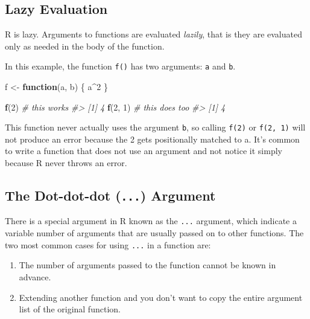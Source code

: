 \documentclass[]{book}
\newenvironment{Shaded}{\begin{snugshade}}{\end{snugshade}}
\newcommand{\KeywordTok}[1]{\textcolor[rgb]{0.13,0.29,0.53}{\textbf{#1}}}
\newcommand{\DecValTok}[1]{\textcolor[rgb]{0.00,0.00,0.81}{#1}}
\newcommand{\StringTok}[1]{\textcolor[rgb]{0.31,0.60,0.02}{#1}}
\newcommand{\CommentTok}[1]{\textcolor[rgb]{0.56,0.35,0.01}{\textit{#1}}}
\newcommand{\ControlFlowTok}[1]{\textcolor[rgb]{0.13,0.29,0.53}{\textbf{#1}}}
\newcommand{\OperatorTok}[1]{\textcolor[rgb]{0.81,0.36,0.00}{\textbf{#1}}}
\newcommand{\NormalTok}[1]{#1}
\providecommand{\tightlist}{%
  \setlength{\itemsep}{0pt}\setlength{\parskip}{0pt}}
\begin{document}
\subsection{Lazy Evaluation}\label{lazy-evaluation}

R is lazy. Arguments to functions are evaluated \emph{lazily}, that is
they are evaluated only as needed in the body of the function.

In this example, the function \texttt{f()} has two arguments: \texttt{a}
and \texttt{b}.

\begin{Shaded}
\begin{Highlighting}[]
\NormalTok{f <-}\StringTok{ }\ControlFlowTok{function}\NormalTok{(a, b) \{}
\NormalTok{  a}\OperatorTok{^}\DecValTok{2}
\NormalTok{\} }

\KeywordTok{f}\NormalTok{(}\DecValTok{2}\NormalTok{)     }\CommentTok{# this works}
\CommentTok{#> [1] 4}
\KeywordTok{f}\NormalTok{(}\DecValTok{2}\NormalTok{, }\DecValTok{1}\NormalTok{)  }\CommentTok{# this does too}
\CommentTok{#> [1] 4}
\end{Highlighting}
\end{Shaded}

This function never actually uses the argument \texttt{b}, so calling
\texttt{f(2)} or \texttt{f(2,\ 1)} will not produce an error because the
2 gets positionally matched to a. It's common to write a function that
does not use an argument and not notice it simply because R never throws
an error.

\subsection{\texorpdfstring{The Dot-dot-dot (\texttt{...})
Argument}{The Dot-dot-dot (...) Argument}}\label{the-dot-dot-dot-...-argument}

There is a special argument in R known as the \texttt{...} argument,
which indicate a variable number of arguments that are usually passed on
to other functions. The two most common cases for using \texttt{...} in
a function are:

\begin{enumerate}
\def\labelenumi{\arabic{enumi}.}
\tightlist
\item
  The number of arguments passed to the function cannot be known in
  advance.
\item
  Extending another function and you don't want to copy the entire
  argument list of the original function.
\end{enumerate}
\end{document}
